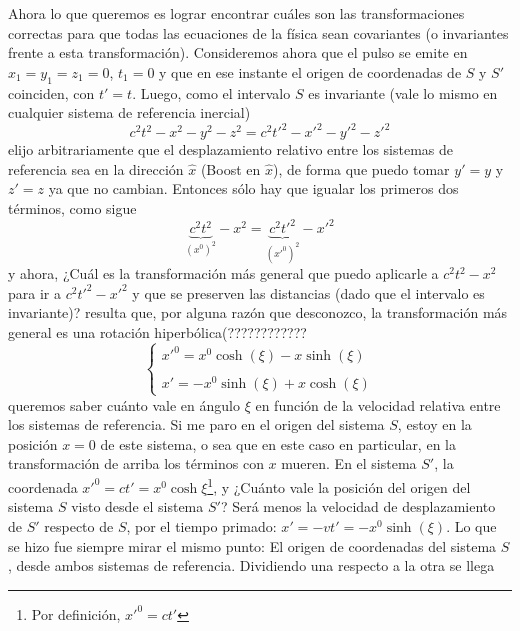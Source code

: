 \indent Ahora lo que queremos es lograr encontrar cuáles son las transformaciones correctas para que todas las ecuaciones de la física sean covariantes (o invariantes frente a esta transformación). Consideremos ahora que el pulso se emite en $x_{1} = y_{1} = z_{1} = 0$, $t_{1} = 0$ y que en ese instante el origen de coordenadas de $S$ y $S'$ coinciden, con $t' = t$. Luego, como el intervalo $S$ es invariante (vale lo mismo en cualquier sistema de referencia inercial)
\begin{equation*}
    c^{2}t^{2} - x^{2} - y^{2} - z^{2} =
    c^{2}t'^{2} - x'^{2} - y'^{2} - z'^{2} 
\end{equation*}
elijo arbitrariamente que el desplazamiento relativo entre los sistemas de referencia sea en la dirección $\hat{x}$ (Boost en $\hat{x}$), de forma que puedo tomar $y' = y$ y $z' = z$ ya que no cambian. Entonces sólo hay que igualar los primeros dos términos, como sigue
\begin{equation*}
    \underbrace{
        c^{2}t^{2}
    }_{(x^{0})^{2}}
    -x^{2} = 
    \underbrace{
        c^{2}t'^{2}
    }_{(x'^{0})^{2}}
    -x'^{2}
\end{equation*}
y ahora, ¿Cuál es la transformación más general que puedo aplicarle a $c^{2}t^{2} - x^{2}$ para ir a $c^{2}t'^{2} - x'^{2}$ y que se preserven las distancias (dado que el intervalo es invariante)? resulta que, por alguna razón que desconozco, la transformación más general es una rotación hiperbólica(????????????
\begin{equation*}
    \left\{
        \begin{matrix}
            x'^{0} = x^{0}\cosh{(\xi)} - x\sinh{(\xi)}\\
            \\
            x' = -x^{0}\sinh{(\xi)} + x\cosh{(\xi)}
        \end{matrix}
    \right.
\end{equation*}
queremos saber cuánto vale en ángulo $\xi$ en función de la velocidad relativa entre los sistemas de referencia. Si me paro en el origen del sistema $S$, estoy en la posición $x=0$ de este sistema, o sea que en este caso en particular, en la transformación de arriba los términos con $x$ mueren. En el sistema $S'$, la coordenada $x'^{0} = ct' = x^{0}\cosh{\xi}$\footnote{Por definición, $x'^{0} = ct'$}, y ¿Cuánto vale la posición del origen del sistema $S$ visto desde el sistema $S'$? Será menos la velocidad de desplazamiento de $S'$ respecto de $S$, por el tiempo primado: $x' = -vt' = -x^{0}\sinh{(\xi)}$. Lo que se hizo fue siempre mirar el mismo punto: El origen de coordenadas del sistema $S$, desde ambos sistemas de referencia. Dividiendo una respecto a la otra se llega 
